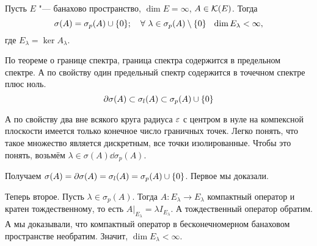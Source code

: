 \begin{The}
  Пусть $E$ "--- банахово пространство, $\dim E = \infty$, $A\in\mathcal K(E)$. Тогда
\[
  \sigma(A) = \sigma_p(A)\cup\{0\};\quad
  \forall\ \lambda\in\sigma_p(A)\setminus\{0\}\hskip .75em plus.1em minus.08em\relax \dim E_\lambda<\infty,
\]
где $E_\lambda = \ker A_\lambda$.
\end{The}
\begin{Proof}
  По теореме о границе спектра, граница спектра содержится в предельном спектре. А по свойству один предельный спектр содержится в точечном спектре плюс ноль.
\[
  \partial \sigma(A) \subset \sigma_l(A)\subset \sigma_p(A)\cup\{0\}
\]

 А по свойству два вне всякого круга радиуса $\varepsilon$ с центром в нуле на компексной плоскости имеется только конечное число граничных точек.
Легко понять, что такое множество является дискретным, все точки изолированные. Чтобы это понять, возьмём $\lambda\in\sigma(A)\dd \sigma_p(A)$.

Получаем $\sigma(A) = \partial\sigma(A) = \sigma_l(A) = \sigma_p(A)\cup\{0\}$.
Первое мы доказали.


Теперь второе. Пусть $\lambda\in\sigma_p(A)$. Тогда $A\colon E_\lambda\to E_\lambda$ компактный оператор и кратен тождественному, то есть $A|_{E_\lambda} = \lambda I_{E_\lambda}$. А тождественный оператор обратим. А мы доказывали, что компактный оператор в бесконечномерном банаховом пространстве необратим. Значит, $\dim E_\lambda<\infty$.
\end{Proof}

